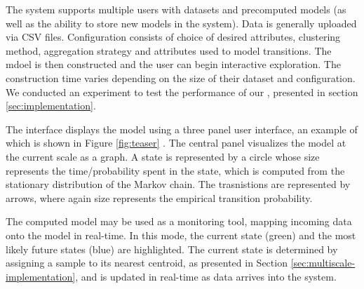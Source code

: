
\iffalse
Features  
\begin{itemize}
	\item Qualitative representation - states and transitions
	\item State identification services:
	\begin{itemize}
		\item State details and attribute highlighting - histograms + attribute colors
		\item \lstopar{Timeline + parallel coordinates \cite{parcoords} - when do states occur in time}
		\item \lstopar{Coloring states based on attributes}
		\item Decision trees + rule extraction - Explanation of states
		\item Automatic name generation
		\item Zooming into a state + showing paths from a state
	\end{itemize}
\end{itemize}
\fi

The system supports multiple users with datasets and precomputed models (as well as the ability to store new models in the system). Data is generally uploaded via CSV files.  Configuration consists of choice of desired attributes,  clustering method, aggregation strategy and attributes used to model transitions. The mdoel is then constructed and the user can begin interactive exploration.  The construction time varies depending on the size of 
their dataset and configuration. We conducted an experiment to test the performance of our ,
presented in section \ref{sec:implementation}.

The interface displays the model using a three panel user interface, an example of
which is shown in Figure \ref{fig:teaser} . The central panel visualizes the model at the current scale as a graph. A state is represented by a circle  whose size represents the time/probability spent in the state, which is computed from the stationary distribution of the Markov chain. The trasnistions are represented by arrows, where again size represents the empirical transition probability. 

The computed model may be used as a monitoring tool, mapping incoming data onto the model in real-time. 
In this mode, the current state (green) and the most likely future states (blue)
are highlighted. The current state is determined by assigning a sample to its nearest 
centroid, as presented in Section \ref{sec:multiscale-implementation}, and is updated in real-time as
data arrives into the system.

